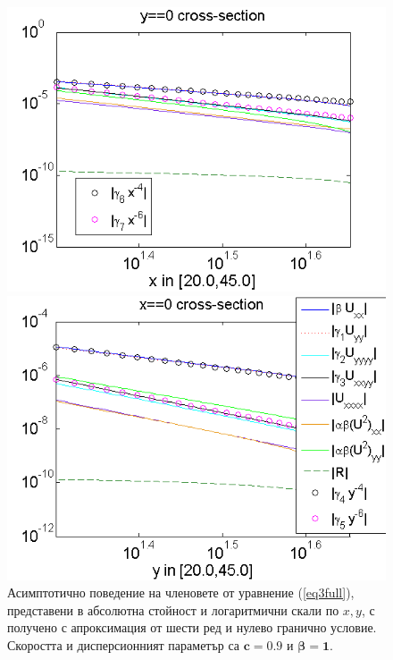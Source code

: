 \documentclass[a4paper]{article}
\newcommand{\rf}[1]{(\ref{#1})}
\theoremstyle{remark}
\begin{document}
\begin{large}
\begin{figure}[ht]	
	\begin{minipage}[b]{0.95\linewidth}
		\raggedleft
		\includegraphics[width=\linewidth]{AssymptForEachTerm/bt1_c010_090/ChristovIC_AlongX_50_ZB2_bt1_c090_h020_O(h^6).png}
	\end{minipage}
	\begin{minipage}[b]{0.95\linewidth}
		 \raggedright
		\includegraphics[width=\linewidth]{AssymptForEachTerm/bt1_c010_090/ChristovIC_AlongY_50_ZB2_bt1_c090_h020_O(h^6).png}
	\end{minipage}
	\caption{Асимптотично поведение на членовете от уравнение \rf{eq3full}, представени в абсолютна стойност и логаритмични скали по $x,y$, с получено с апроксимация от шести ред и нулево гранично условие. Скоростта и дисперсионният параметър са $\boldsymbol{c=0.9}$ и $\boldsymbol{\beta = 1}$. }
	\label{fig:assympt_beta1c09}
\end{figure}
\FloatBarrier

\end{large}
\end{document}
